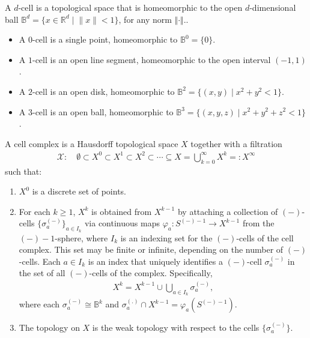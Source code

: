 \begin{definition}[\(d\)-cell]
A \(d\)-cell is a topological space that is homeomorphic to the open \(d\)-dimensional ball $\mathbb{B}^d = \{ x \in \mathbb{R}^d \; \vert \; \|x\| < 1 \}$, for any norm $\Vert \cdot \Vert.$.
\end{definition}

\begin{example}\noindent
\begin{itemize}
    \item A $0$-cell is a single point, homeomorphic to \(\mathbb{B}^0 = \{ 0 \}\).
    \item A $1$-cell is an open line segment, homeomorphic to the open interval \((-1, 1)\).
    \item A $2$-cell is an open disk, homeomorphic to \(\mathbb{B}^2 = \{ (x, y) \; \vert \; x^2 + y^2 < 1 \}\).
    \item A $3$-cell is an open ball, homeomorphic to \(\mathbb{B}^3 = \{ (x, y, z) \; \vert \; x^2 + y^2 + z^2 < 1 \}\).
\end{itemize}
\end{example}

\begin{definition}
A cell complex is a Hausdorff topological space \(X\) together with a filtration
\begin{align}
\mathcal{X}: \quad \emptyset \subset X^0 \subset X^1 \subset X^2 \subset \cdots \subseteq X = \bigcup_{k=0}^{\infty} X^k =: X^\infty
\end{align}
such that:
\begin{enumerate}
    \item \(X^0\) is a discrete set of points.
    \item For each \(k \geq 1\), \(X^k\) is obtained from \(X^{k-1}\) by attaching a collection of \((-)\)-cells \(\{\sigma^{(-)}_a\}_{a \in I_k}\) via continuous maps \(\varphi_a : S^{(-)-1} \to X^{k-1}\) from the $(-)-1$-sphere, where \(I_k\) is an indexing set for the \((-)\)-cells of the cell complex. This set may be finite or infinite, depending on the number of \((-)\)-cells. Each \(a \in I_k\) is an index that uniquely identifies a \((-)\)-cell \(\sigma^{(-)}_a\) in the set of all \((-)\)-cells of the complex. Specifically,
\begin{align}
    X^k = X^{k-1} \cup \bigcup_{a \in I_k} \sigma^{(-)}_a,
\end{align}
    where each \(\sigma^{(-)}_a \cong \mathbb{B}^k\) and \(\sigma^{(.)}_a \cap X^{k-1} = \varphi_a(S^{(-)-1})\).
    \item The topology on \(X\) is the weak topology with respect to the cells \(\{\sigma^{(-)}_a\}\).
\end{enumerate}
\end{definition}

